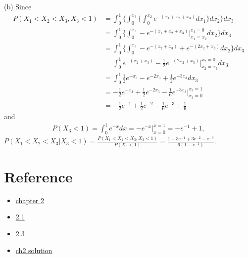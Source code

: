 \begin{solve}
    \par
    (b) Since
    \begin{align*}
        P(X_1<X_2<X_3,X_3<1)&=\int_{0}^{1}\{\int_{0}^{x_3}\{\int_{0}^{x_2}e^{-(x_1+x_2+x_3)} dx_1\}dx_2\}dx_3\\
                            &=\int_{0}^{1}\{\int_{0}^{x_3}-e^{-(x_1+x_2+x_3)}|_{x_1=x_2}^{x_1=0}dx_2\}dx_3\\
                            &=\int_{0}^{1}\{\int_{0}^{x_3}-e^{-(x_2+x_3)}+e^{-(2x_2+x_3)}dx_2\}dx_3\\
                            &= \int_{0}^{1} e^{-(x_2+x_3)}-\frac{1}{2}e^{-(2x_2+x_3)}|_{x_2=x_3}^{x_2=0}dx_3\\
                            &= \int_{0}^{1} \frac{1}{2} e^{-x_3} -e^{-2x_3}+\frac{1}{2}e^{-3x_3}dx_3\\
                            &= -\frac{1}{2}e^{-x_3}+\frac{1}{2}e^{-2x_3}-\frac{1}{6}e^{-3x_3}|_{x_3=0}^{x_3=1}\\
                            &= -\frac{1}{2}e^{-1} + \frac{1}{2}e^{-2}-\frac{1}{6}e^{-3}+\frac{1}{6}
    \end{align*}
    and 
    \begin{align*}
        P(X_3<1) = \int_{0}^{1} e^{-x} dx = -e^{-x}|_{x=0}^{x=1}=-e^{-1}+1,
    \end{align*}
    $P(X_1<X_2<X_3|X_3<1)=\frac{P(X_1<X_2<X_3,X_3<1)}{P(X_3<1)}=\frac{1-3e^{-1}+3e^{-2}-e^{-3}}{6(1-e^{-1})}$.
\end{solve}



\section{Reference}
\begin{itemize}
    \item \href{https://ccrgpages.rit.edu/~whelan/courses/2013_3fa_STAT_405/notes02.pdf}{chapter 2}
    \item \href{https://faculty.etsu.edu/gardnerr/4047/notes-Hogg-McKean-Craig/Hogg-McKean-Craig-2-1.pdf}{2.1}
    \item \href{https://faculty.etsu.edu/gardnerr/4047/notes-Hogg-McKean-Craig/Hogg-McKean-Craig-2-3.pdf}{2.3}
    \item \href{https://tomoki-okuno.com/files/math/Ch2_sol.pdf}{ch2 solution}
\end{itemize}